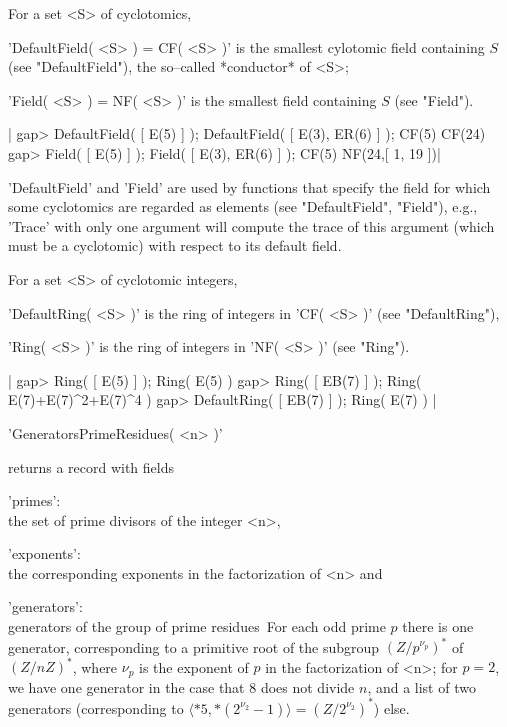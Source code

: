 For a set <S> of cyclotomics,

'DefaultField( <S> ) = CF( <S> )' is the smallest cylotomic field
containing $S$ (see "DefaultField"), the so--called *conductor* of <S>;

'Field( <S> ) = NF( <S> )' is the smallest field containing $S$ (see
"Field").

|    gap> DefaultField( [ E(5) ] ); DefaultField( [ E(3), ER(6) ] );
    CF(5)
    CF(24)
    gap> Field( [ E(5) ] ); Field( [ E(3), ER(6) ] );
    CF(5)
    NF(24,[ 1, 19 ])|

'DefaultField' and 'Field' are used by functions that specify the field
for which some cyclotomics are regarded as elements (see "DefaultField",
"Field"), e.g., 'Trace' with only one argument will compute the trace of
this argument (which must be a cyclotomic) with respect to its default
field.

%
%

For a set <S> of cyclotomic integers,

'DefaultRing( <S> )' is the ring of integers in 'CF( <S> )'
(see "DefaultRing"),

'Ring( <S> )' is the ring of integers in 'NF( <S> )' (see "Ring").

|    gap> Ring( [ E(5) ] );
    Ring( E(5) )
    gap> Ring( [ EB(7) ] );
    Ring( E(7)+E(7)^2+E(7)^4 )
    gap> DefaultRing( [ EB(7) ] );
    Ring( E(7) ) |


'GeneratorsPrimeResidues( <n> )'

returns a record with fields

'primes':\\
     the set of prime divisors of the integer <n>,

'exponents':\\
     the corresponding exponents in the factorization of <n> and

'generators':\\
     generators of the group of prime residues\:\ For each odd prime $p$
     there is one generator, corresponding to a primitive root of the
     subgroup $(Z/p^{\nu_p})^{\ast}$ of $(Z/nZ)^{\ast}$, where $\nu_p$ is
     the exponent of $p$ in the factorization of <n>; for $p = 2$, we
     have one generator in the case that 8 does not divide $n$, and a
     list of two generators (corresponding to
     $\langle\ast 5, \ast(2^{\nu_2}-1)\rangle = (Z/2^{\nu_2})^{\ast}$)
     else.

